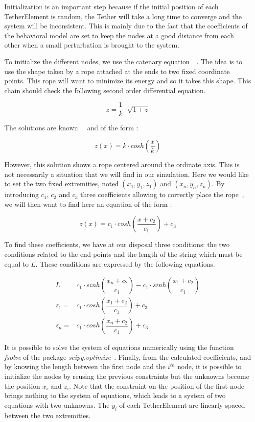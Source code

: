 Initialization is an important step because if the initial position of each TetherElement is random, the Tether will take a long time to converge and the system will be inconsistent. This is mainly due to the fact that the coefficients of the behavioral model are set to keep the nodes at a good distance from each other when a small perturbation is brought to the system.

To initialize the different nodes, we use the catenary equation~\cite{obrien_general_1967}~\cite{ren_parabolic_2008}. The idea is to use the shape taken by a rope attached at the ends to two fixed coordinate points. This rope will want to minimize its energy and so it takes this shape. This chain should check the following second order differential equation.

$$\ddot{z} = \frac{1}{k} \cdot \sqrt{1 + \dot{z}}$$

The solutions are known~\cite{obrien_general_1967}~\cite{ren_parabolic_2008} and of the form :

$$z(x) = k \cdot cosh\left(\frac{x}{k}\right)$$

However, this solution shows a rope centered around the ordinate axis. This is not necessarily a situation that we will find in our simulation. Here we would like to set the two fixed extremities, noted $(x_1, y_1, z_1)$ and $(x_n, y_n, z_n)$. By introducing $c_1$, $c_2$ and $c_3$ three coefficients allowing to correctly place the rope~\cite{ren_parabolic_2008}, we will then want to find here an equation of the form :

$$z(x) = c_1 \cdot cosh\left(\frac{x+c_2}{c_1}\right)+c_3$$

To find these coefficients, we have at our disposal three conditions: the two conditions related to the end points and the length of the string which must be equal to $L$. These conditions are expressed by the following equations:

\begin{align*}
    L = & c_1 \cdot sinh\left(\dfrac{x_n+c_2}{c_1}\right) - c_1 \cdot sinh\left(\dfrac{x_1+c_2}{c_1}\right) \\
    z_1 = & c_1 \cdot cosh\left(\dfrac{x_1+c_2}{c_1}\right)+c_3 \\
    z_n = & c_1 \cdot cosh\left(\dfrac{x_n+c_2}{c_1}\right)+c_3
\end{align*}

It is possible to solve the system of equations numerically using the function \textit{fsolve} of the package \textit{scipy.optimize}~\cite{noauthor_scipyorg_nodate}. Finally, from the calculated coefficients, and by knowing the length between the first node and the $i^{th}$ node, it is possible to initialize the nodes by reusing the previous constraints but the unknowns become the position $x_i$ and $z_i$. Note that the constraint on the position of the first node brings nothing to the system of equations, which leads to a system of two equations with two unknowns. The $y_i$ of each TetherElement are linearly spaced between the two extremities.